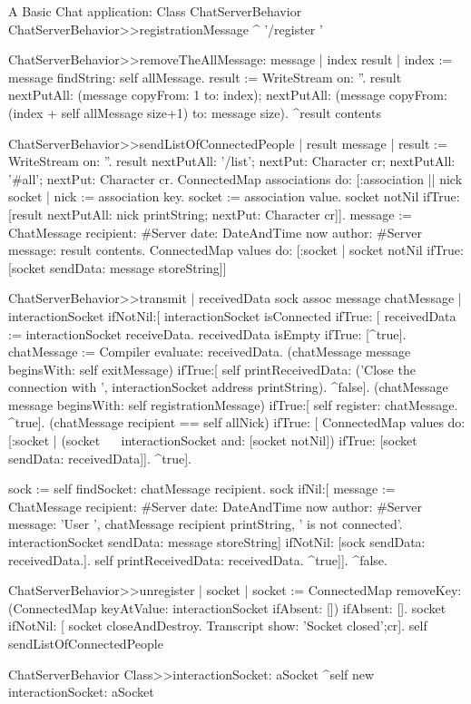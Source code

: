 \documentclass[a4paper,10pt,twoside]{book}
\begin{document}
\begin{script}{A Basic Chat application: Class ChatServerBehavior}
ChatServerBehavior>>registrationMessage
	^ '/register '

ChatServerBehavior>>removeTheAllMessage: message
	| index result |
	index := message findString: self allMessage.
	result := WriteStream on: ''.
	result 
		nextPutAll: (message copyFrom: 1 to: index);
		nextPutAll: (message copyFrom: (index + self allMessage size+1) to: message size).
	^result contents

ChatServerBehavior>>sendListOfConnectedPeople
	| result message |
	result := WriteStream on: ''.
	result 
		nextPutAll: '/list';
		nextPut: Character cr;
		nextPutAll: '#all';
		nextPut: Character cr.
	ConnectedMap associations do: [:association || nick socket |
		nick := association key.
		socket := association value.
		socket notNil
			ifTrue: [result 
						nextPutAll: nick printString;
						nextPut: Character cr]].
	message := ChatMessage
					recipient: #Server
					date: DateAndTime now
					author: #Server
					message: result contents.
	ConnectedMap values do: [:socket |
		socket notNil
			ifTrue: [socket sendData: message storeString]]


ChatServerBehavior>>transmit
	| receivedData  sock assoc message chatMessage |
	interactionSocket ifNotNil:[
		interactionSocket isConnected 
			ifTrue: [	
				receivedData := interactionSocket receiveData.
				receivedData isEmpty ifTrue: [^true].
				chatMessage := Compiler evaluate: receivedData.
				(chatMessage message beginsWith: self exitMessage) 
					ifTrue:[
						self printReceivedData: ('Close the connection with ', interactionSocket address printString).
						^false].
				(chatMessage message beginsWith: self registrationMessage)
					ifTrue:[
						self register: chatMessage.
						^true].
				(chatMessage recipient == self allNick)
					ifTrue: [
						ConnectedMap values do: [:socket |
							(socket ~~ interactionSocket and: [socket notNil])
								ifTrue: [socket sendData: receivedData]].
						^true].
				
				sock := self findSocket: chatMessage recipient.
				sock 
					ifNil:[
						message := ChatMessage
										recipient: #Server
										date: DateAndTime now
										author: #Server
										message: 'User ', chatMessage recipient printString, ' is not connected'.
						interactionSocket sendData: message storeString]
					ifNotNil: [sock sendData: receivedData.].
				self printReceivedData: receivedData.
				^true]].
	^false.


ChatServerBehavior>>unregister
	| socket |
	socket := ConnectedMap removeKey: (ConnectedMap keyAtValue: interactionSocket ifAbsent: []) ifAbsent: [].
	socket ifNotNil: [
		 socket closeAndDestroy.
		Transcript show: 'Socket closed';cr].
	self sendListOfConnectedPeople

ChatServerBehavior Class>>interactionSocket: aSocket
	^self new interactionSocket: aSocket
\end{script}
\end{document}
